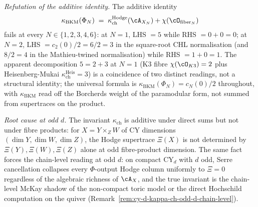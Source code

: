 \emph{Refutation of the additive identity.} The additive identity
\[
 \kappa_{\mathrm{BKM}}(\Phi_N) \;=\;
 \kappa_{\mathrm{ch}}^{\mathrm{Hodge}}(\cA_{X_N}) + \chi(\cO_{\mathrm{fiber}_N})
\]
fails at every $N \in \{1, 2, 3, 4, 6\}$: at $N = 1$, LHS $= 5$ while
RHS $= 0 + 0 = 0$; at $N = 2$, LHS $= c_2(0)/2 = 6/2 = 3$ in the
square-root CHL normalisation (and $8/2 = 4$ in the Mathieu-twined
normalisation) while RHS $= 1 + 0 = 1$. The
apparent decomposition $5 = 2 + 3$ at $N = 1$ (K3 fibre $\chi(\cO_{K3})
= 2$ plus Heisenberg-Mukai $\kappa_{\mathrm{ch}}^{\mathrm{Heis}} = 3$)
is a coincidence of two distinct readings, not a
structural identity; the universal formula is
$\kappa_{\mathrm{BKM}}(\Phi_N) = c_N(0)/2$ throughout, with
$\kappa_{\mathrm{BKM}}$ read off the Borcherds weight of the paramodular
form, not summed from supertraces on the product.

\emph{Root cause at odd $d$.} The invariant $\kappa_{\mathrm{ch}}$ is
additive under direct sums but not under fibre products: for
$X = Y \times_Z W$ of CY dimensions $(\dim Y, \dim W, \dim Z)$, the
Hodge supertrace $\Xi(X)$ is not determined by $\Xi(Y), \Xi(W), \Xi(Z)$
alone at odd fibre-product dimension. The same fact forces the
chain-level reading at odd $d$: on compact CY$_d$ with $d$ odd, Serre
cancellation collapses every $\Phi$-output Hodge column uniformly to
$\Xi = 0$ regardless of the algebraic richness of $\cA_X$, and the
true invariant is the chain-level McKay shadow of the non-compact
toric model or the direct Hochschild computation on the quiver
(Remark~\ref{rem:cy-d-kappa-ch-odd-d-chain-level}).


